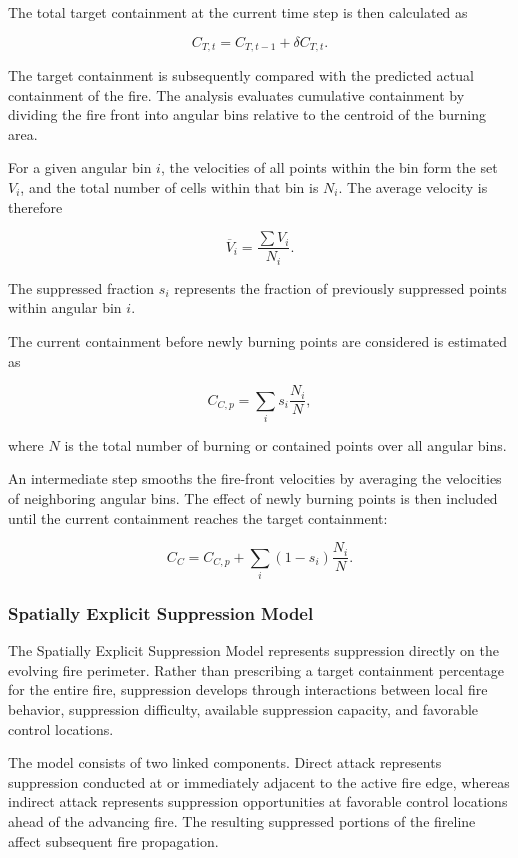 The total target containment at the current time step is then calculated as

\[
C_{T,t}
=
C_{T,t-1}
+
\delta C_{T,t}.
\]

The target containment is subsequently compared with the predicted actual
containment of the fire. The analysis evaluates cumulative containment by
dividing the fire front into angular bins relative to the centroid of the
burning area.

For a given angular bin $i$, the velocities of all points within the bin form
the set $V_i$, and the total number of cells within that bin is $N_i$. The
average velocity is therefore

\[
\overline{V}_i
=
\frac{\sum V_i}{N_i}.
\]

The suppressed fraction $s_i$ represents the fraction of previously suppressed
points within angular bin $i$.

The current containment before newly burning points are considered is estimated
as

\[
C_{C,p}
=
\sum_i s_i\frac{N_i}{N},
\]

where $N$ is the total number of burning or contained points over all angular
bins.

An intermediate step smooths the fire-front velocities by averaging the
velocities of neighboring angular bins. The effect of newly burning points is
then included until the current containment reaches the target containment:

\[
C_C
=
C_{C,p}
+
\sum_i
(1-s_i)\frac{N_i}{N}.
\]


\subsubsection{Spatially Explicit Suppression Model}

The Spatially Explicit Suppression Model represents suppression directly on the
evolving fire perimeter. Rather than prescribing a target containment percentage
for the entire fire, suppression develops through interactions between local
fire behavior, suppression difficulty, available suppression capacity, and
favorable control locations.

The model consists of two linked components. Direct attack represents
suppression conducted at or immediately adjacent to the active fire edge,
whereas indirect attack represents suppression opportunities at favorable
control locations ahead of the advancing fire. The resulting suppressed
portions of the fireline affect subsequent fire propagation.


